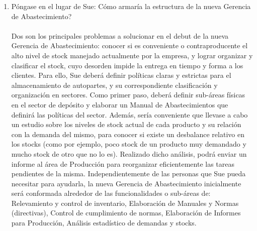 \documentclass[a4paper,10pt,titlepage]{article}
\begin{document}
\begin{enumerate}
\textbf{Gerencia de Abastecimiento}

Se encarga de almacenar insumos, repuestos y materiales que se consumen dentro del establecimiento necesarios para el cumplimiento de las tareas de cada \'area. Sus principales funciones son: 
\begin{itemize}
\item Conocimiento de la necesidad.
\item Hacer y esperar el pedido.
\item Recibir los art\'iculos o servicios.
\item Controlar el inventario.
\item Distribuir los productos a los departamentos.
\end{itemize}

  \item P\'ongase en el lugar de Sue: C\'omo armar\'ia la estructura de la nueva Gerencia de Abastecimiento?
  \\ \\
  Dos son los principales problemas a solucionar en el debut de la nueva Gerencia de Abastecimiento: conocer si es conveniente o contraproducente el alto nivel de stock manejado actualmente por la empresa, y lograr organizar y clasificar el stock, cuyo desorden impide la entrega en tiempo y forma a los clientes. Para ello, Sue deber\'a definir pol\'iticas claras y estrictas para el almacenamiento de autopartes, y su correspondiente clasificaci\'on y organizaci\'on en sectores. Como primer paso, deber\'a definir sub-\'areas f\'isicas en el sector de dep\'osito y elaborar un Manual de Abastecimientos que definir\'a las pol\'iticas del sector. Adem\'as, ser\'ia conveniente que llevase a cabo un estudio sobre los niveles de stock actual de cada producto y su relaci\'on con la demanda del mismo, para conocer si existe un desbalance relativo en los stocks (como por ejemplo, poco stock de un producto muy demandado y mucho stock de otro que no lo es). Realizado dicho an\'alisis, podr\'a enviar un informe al \'area de Producci\'on para reorganizar eficientemente las tareas pendientes de la misma. Independientemente de las personas que Sue pueda necesitar para ayudarla, la nueva Gerencia de Abastecimiento inicialmente ser\'a conformada alrededor de las funcionalidades o sub-\'areas de: Relevamiento y control de inventario, Elaboraci\'on de Manuales y Normas (directivas), Control de cumplimiento de normas, Elaboraci\'on de Informes para Producci\'on, An\'alisis estad\'istico de demandas y stocks.
  

\end{enumerate}
\end{document}
